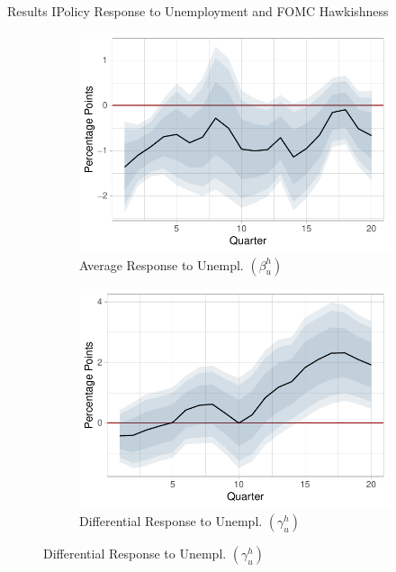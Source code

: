 \documentclass[11pt,pdf,aspectratio=129]{beamer}
\begin{document}
\begin{frame}{Results I}{Policy Response to Unemployment and FOMC Hawkishness}

    \begin{figure}[!htbp]\centering
        \label{fig:LP}
        \begin{subfigure}[b]{0.49\textwidth}
            \centering
            \caption{Average Response to Unempl. $\left(\beta_u^h\right)$}
            \label{fig:average_unemployment}
            \includegraphics[width=\linewidth]{average_unemployment.pdf}
        \end{subfigure}
        \hfill
        \begin{subfigure}[b]{0.49\textwidth}
            \centering
            \caption{Differential Response to Unempl. $\left(\gamma_u^h\right)$}
            \label{fig:differential_unemployment}
            \includegraphics[width=\linewidth]{differential_unemployment.pdf}

\end{subfigure}
\end{figure}
\end{frame}
\end{document}
